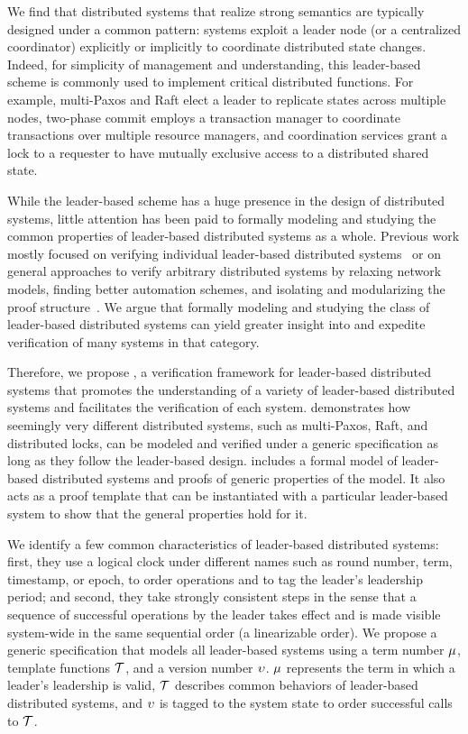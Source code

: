 We find that distributed systems that realize strong semantics are typically
designed under a common pattern: systems exploit a leader node
(or a centralized coordinator) explicitly or implicitly to coordinate
distributed state changes. Indeed, for simplicity of management and understanding,
this leader-based scheme is commonly used to implement critical distributed
functions. For example, multi-Paxos and Raft elect a leader to replicate states
across multiple nodes, two-phase commit employs a transaction manager to
coordinate transactions over multiple resource managers, and coordination
services grant a lock to a requester to have mutually exclusive access to a
distributed shared state.

While the leader-based scheme has a huge presence in the design of distributed systems,
little attention has been paid to formally modeling and studying the common properties
of leader-based distributed systems as a whole. Previous work mostly focused
on verifying individual leader-based distributed systems~\cite{ironfleet, cppraft}
or on general approaches to verify arbitrary distributed systems by relaxing network
models, finding better automation schemes, and isolating and modularizing the
proof structure~\cite{verdi, disel, modular}. We argue that formally
modeling and studying the class of leader-based distributed systems can yield greater
insight into and expedite verification of many systems in that category.


Therefore, we propose \sysname{}, a verification framework for
leader-based distributed systems that promotes the understanding of
a variety of leader-based distributed systems and facilitates the verification
of each system. \sysname{} demonstrates how seemingly very different distributed systems,
such as multi-Paxos, Raft, and distributed locks, can be modeled and verified under
a generic specification as long as they follow the leader-based design.
\sysname{} includes a formal model of leader-based distributed systems and
proofs of generic properties of the model.
It also acts as a proof template that can be instantiated with a particular leader-based
system to show that the general properties hold for it.



We identify a few common characteristics of leader-based distributed systems:
first, they use a logical clock under different names such as round number,
term, timestamp, or epoch, to order operations and to tag the leader's
leadership period;
and second, they take strongly consistent steps in the sense that a
sequence of successful operations by the leader takes effect and is made visible
system-wide in the same sequential order (a linearizable order).
We propose a generic specification that models all leader-based systems using a
term number $\mu$, template functions $\mathcal{T}$, and
a version number $\upsilon$. $\mu$ represents the term in which a leader's leadership is valid,
$\mathcal{T}$ describes common behaviors of leader-based distributed systems,
and $\upsilon$ is tagged to the system state to order successful calls to $\mathcal{T}$.


